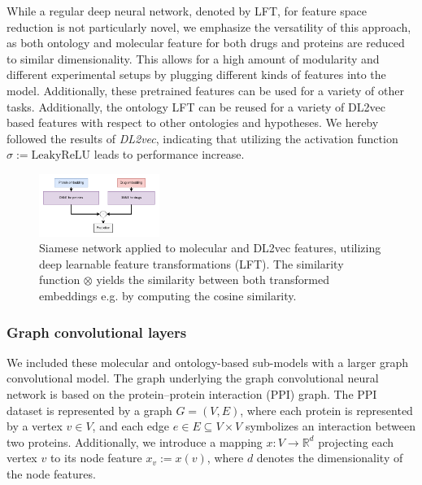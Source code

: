 \documentclass{bioinfo}
\begin{document}
While a regular deep neural network, denoted by LFT, for feature space reduction is not particularly novel, we emphasize the versatility of this approach, as both ontology and molecular feature for both drugs and proteins are reduced to similar dimensionality. This allows for a high amount of modularity and different experimental setups by plugging different kinds of features into the model. Additionally, these pretrained features can be used for a variety of other tasks. Additionally, the ontology LFT can be reused for a variety of DL2vec based features with respect to other ontologies and hypotheses. We hereby followed the results of \textit{DL2vec}, indicating that utilizing the activation function $\sigma := \mathrm{LeakyReLU}$ leads to performance increase.



\begin{figure}[!tpb]%
	\centerline{\includegraphics[width=0.35\textwidth]{figures/siamese_network.png}}
	\caption{Siamese network applied to molecular and DL2vec
          features, utilizing deep learnable feature transformations
          (LFT). The similarity function $\otimes$ yields the
          similarity between both transformed embeddings e.g. by
          computing the cosine similarity.}
	\label{fig:SiameseNetwork}
\end{figure}




\subsubsection{Graph convolutional layers}

We included these molecular and ontology-based sub-models with a
larger graph convolutional model. The graph underlying the graph
convolutional neural network is based on the protein--protein
interaction (PPI) graph. The PPI dataset is represented by a graph
$G=(V,E)$, where each protein is represented by a vertex $v\in V$, and
each edge $e\in E\subseteq V\times V$ symbolizes an interaction
between two proteins. Additionally, we introduce a mapping
$x:V\rightarrow\mathbb{R}^{d}$ projecting each vertex $v$ to its node
feature $x_v := x(v)$, where $d$ denotes the dimensionality of the node
features.
 
\end{document}
